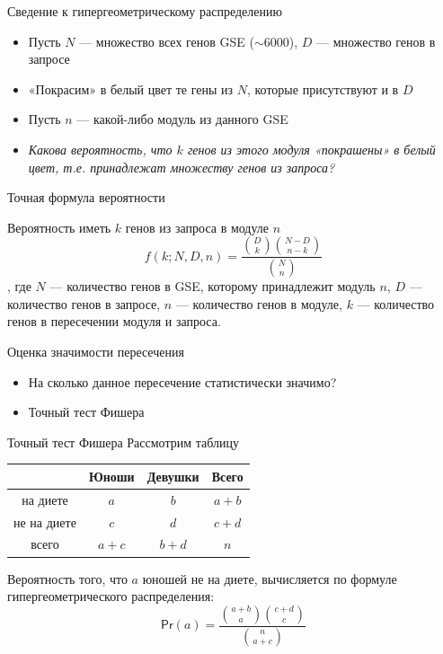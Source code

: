 \documentclass[10pt,pdf,utf8,russian,aspectratio=169]{beamer}
\begin{document}
\begin{frame}{Сведение к гипергеометрическому распределению}
  \begin{itemize}[<+->]
    \item Пусть $N$ --- множество всех генов GSE ($\sim 6000$), $D$ --- множество генов в запросе
    \item «Покрасим» в белый цвет те гены из $N$, которые присутствуют и в $D$
    \item Пусть $n$ --- какой-либо модуль из данного GSE
    \item \emph{Какова вероятность, что $k$ генов из этого модуля «покрашены» в белый цвет, т.е. принадлежат множеству генов из запроса?}
  \end{itemize}
\end{frame}

\begin{frame}{Точная формула вероятности}
    \begin{block}{Вероятность иметь $k$ генов из запроса в модуле $n$}
        \begin{equation}
        f(k; N, D, n) = \frac{\binom{D}{k}\binom{N - D}{n - k}}{\binom{N}{n}}
        \end{equation},
        где $N$ --- количество генов в GSE, которому принадлежит модуль $n$,
            $D$ --- количество генов в запросе,
            $n$ --- количество генов в модуле,
            $k$ --- количество генов в пересечении модуля и запроса.
    \end{block}
\end{frame}

\begin{frame}{Оценка значимости пересечения}
  \begin{itemize}[<+->]
    \item На сколько данное пересечение статистически значимо?
    \item Точный тест Фишера
  \end{itemize}
\end{frame}

\begin{frame}{Точный тест Фишера}
    Рассмотрим таблицу
    \begin{table}[!ht]
        \centering
        \begin{tabular}{c|c|c|c}
                 & Юноши   & Девушки &  Всего \\ \hline
        на диете & $a$     & $b$     & $a + b$ \\ \hline
     не на диете & $c$     & $d$     & $c + d$ \\ \hline
           всего & $a + c$ & $b + d$ & $n$ \\
        \end{tabular}
    \end{table}
    Вероятность того, что $a$ юношей не на диете, вычисляется по формуле гипергеометрического распределения:
        $$\mathsf{Pr}(a) = \frac{\binom{a + b}{a}\binom{c + d}{c}}{\binom{n}{a + c}}$$
\end{frame}
\end{document}
